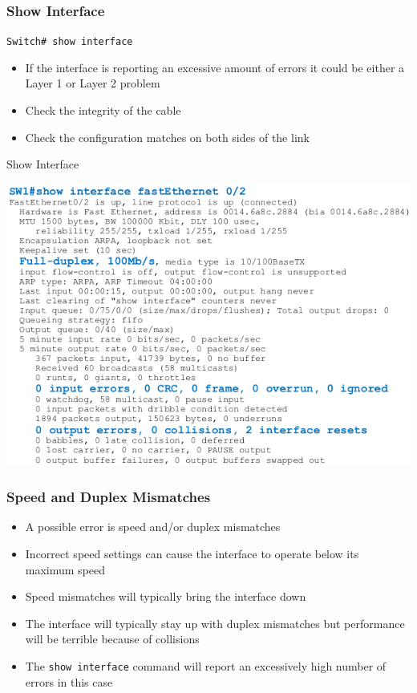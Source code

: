 \documentclass[pdflatex,compress,mathserif]{beamer}
\begin{document}
\begin{frame}
	\frametitle{Show Interface}
	\texttt{Switch\# show interface}
	\begin{itemize}
		\item If the interface is reporting an excessive amount of errors it could be either a Layer 1 or Layer 2 problem
		\item Check the integrity of the cable
		\item Check the configuration matches on both sides of the link
	\end{itemize}
\end{frame}

\begin{frame}{Show Interface}
	\begin{center}
		\includegraphics[width=0.8\linewidth]{img/img04}
	\end{center}
\end{frame}

\begin{frame}
	\frametitle{Speed and Duplex Mismatches}
	\begin{itemize}
		\item A possible error is speed and/or duplex mismatches
		\item Incorrect speed settings can cause the interface to operate below its maximum speed
		\item Speed mismatches will typically bring the interface down
		\item The interface will typically stay up with duplex mismatches but performance will be terrible because of collisions
		\item The \texttt{show interface} command will report an excessively high number of errors in this case
	\end{itemize}
\end{frame}
\end{document}
